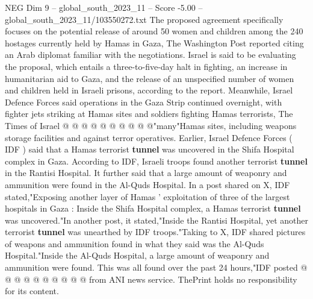 \begin{textsample}{NEG Dim 9 – global\_south\_2023\_11 – Score -5.00 – global\_south\_2023\_11/103550272.txt}
The proposed agreement specifically focuses on the potential release of around 50 women and children among the 240 hostages currently held by Hamas in Gaza, The Washington Post reported citing an Arab diplomat familiar with the negotiations.
Israel is said to be evaluating the proposal, which entails a three-to-five-day halt in fighting, an increase in humanitarian aid to Gaza, and the release of an unspecified number of women and children held in Israeli prisons, according to the report.
Meanwhile, Israel Defence Forces said operations in the Gaza Strip continued overnight, with fighter jets striking at Hamas sites and soldiers fighting Hamas terrorists, The Times of Israel @ @ @ @ @ @ @ @ @ @"many"Hamas sites, including weapons storage facilities and against terror operatives.
Earlier, Israel Defence Forces ( IDF ) said that a Hamas terrorist \textbf{tunnel} was uncovered in the Shifa Hospital complex in Gaza.
According to IDF, Israeli troops found another terrorist \textbf{tunnel} in the Rantisi Hospital.
It further said that a large amount of weaponry and ammunition were found in the Al-Quds Hospital.
In a post shared on X, IDF stated,"Exposing another layer of Hamas ' exploitation of three of the largest hospitals in Gaza : Inside the Shifa Hospital complex, a Hamas terrorist \textbf{tunnel} was uncovered."In another post, it stated,"Inside the Rantisi Hospital, yet another terrorist \textbf{tunnel} was unearthed by IDF troops."Taking to X, IDF shared pictures of weapons and ammunition found in what they said was the Al-Quds Hospital."Inside the Al-Quds Hospital, a large amount of weaponry and ammunition were found.
This was all found over the past 24 hours,"IDF posted @ @ @ @ @ @ @ @ @ @ from ANI news service.
ThePrint holds no responsibility for its content.

\end{textsample}
